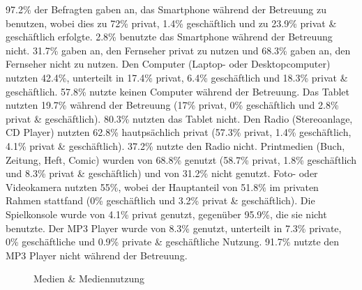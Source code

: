 97.2\% der Befragten gaben an, das Smartphone während der Betreuung zu benutzen, wobei dies zu 72\% privat, 1.4\% geschäftlich und zu 23.9\% privat \& geschäftlich erfolgte. 2.8\% benutzte das Smartphone während der Betreuung nicht. 31.7\% gaben an, den Fernseher privat zu nutzen und 68.3\% gaben an, den Fernseher nicht zu nutzen. Den Computer (Laptop- oder Desktopcomputer) nutzten 42.4\%, unterteilt in 17.4\% privat, 6.4\% geschäftlich und 18.3\% privat \& geschäftlich. 57.8\% nutzte keinen Computer während der Betreuung. Das Tablet nutzten 19.7\% während der Betreuung (17\% privat, 0\% geschäftlich und 2.8\% privat \& geschäftlich). 80.3\% nutzten das Tablet nicht. Den Radio (Stereoanlage, CD Player) nutzten 62.8\% hautpsächlich privat (57.3\% privat, 1.4\% geschäftlich, 4.1\% privat \& geschäftlich). 37.2\% nutzte den Radio nicht. Printmedien (Buch, Zeitung, Heft, Comic) wurden von 68.8\% genutzt (58.7\% privat, 1.8\% geschäftlich und 8.3\% privat \& geschäftlich) und von 31.2\% nicht genutzt. Foto- oder Videokamera nutzten 55\%, wobei der Hauptanteil von 51.8\% im privaten Rahmen stattfand (0\% geschäftlich und 3.2\% privat \& geschäftlich). Die Spielkonsole wurde von 4.1\% privat genutzt, gegenüber 95.9\%, die sie nicht benutzte. Der MP3 Player wurde von 8.3\% genutzt, unterteilt in 7.3\% private, 0\% geschäftliche und 0.9\% private \& geschäftliche Nutzung. 91.7\% nutzte den MP3 Player nicht während der Betreuung.

\begin{figure}[t]
\caption{Medien \& Mediennutzung}\label{fig:Mediennutzung}
\centering
{}
\end{figure}

